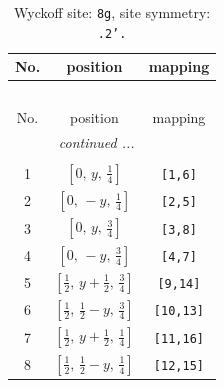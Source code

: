 \documentclass[fleqn,8pt]{jsarticle}
\begin{document}
\begin{longtable}{ccc}
\caption{Wyckoff site: {\tt 8g}, site symmetry: {\tt .2'.}}
 \\
 \hline \hline
No. & position & mapping \\ \hline \endfirsthead

\multicolumn{2}{l}{\tablename\ \thetable{}} \\
 \hline \hline
No. & position & mapping \\ \hline \endhead

 \hline \hline
\multicolumn{2}{r}{\footnotesize\it continued ...} \\ \endfoot

 \hline \hline
\multicolumn{2}{r}{} \\ \endlastfoot

1 & $\left[ 0,\, y,\, \frac{1}{4} \right]$ & {\tt [1,6]} \\ \hline
2 & $\left[ 0,\, - y,\, \frac{1}{4} \right]$ & {\tt [2,5]} \\ \hline
3 & $\left[ 0,\, y,\, \frac{3}{4} \right]$ & {\tt [3,8]} \\ \hline
4 & $\left[ 0,\, - y,\, \frac{3}{4} \right]$ & {\tt [4,7]} \\ \hline
5 & $\left[ \frac{1}{2},\, y + \frac{1}{2},\, \frac{3}{4} \right]$ & {\tt [9,14]} \\ \hline
6 & $\left[ \frac{1}{2},\, \frac{1}{2} - y,\, \frac{3}{4} \right]$ & {\tt [10,13]} \\ \hline
7 & $\left[ \frac{1}{2},\, y + \frac{1}{2},\, \frac{1}{4} \right]$ & {\tt [11,16]} \\ \hline
8 & $\left[ \frac{1}{2},\, \frac{1}{2} - y,\, \frac{1}{4} \right]$ & {\tt [12,15]} \\
\end{longtable}
\renewcommand{\arraystretch}{1.2}
\end{document}
